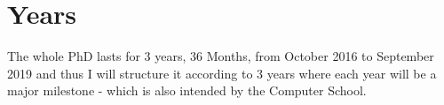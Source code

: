 \section{Years}
The whole PhD lasts for 3 years, 36 Months, from October 2016 to September 2019 and thus I will structure it according to 3 years where each year will be a major milestone - which is also intended by the Computer School.






 
